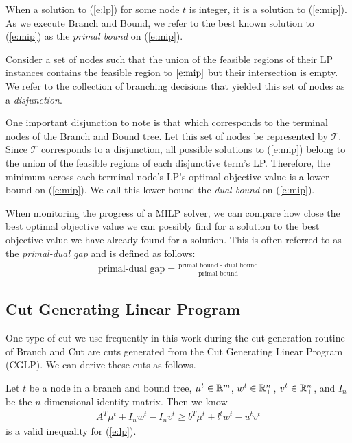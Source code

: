 \documentclass[10pt]{article}
\begin{document}
	When a solution to (\ref{e:lp}) for some node $ t $ is integer, it is a solution to (\ref{e:mip}). As we execute Branch and Bound, we refer to the best known solution to (\ref{e:mip}) as the \textit{primal bound} on (\ref{e:mip}).
	
	Consider a set of nodes such that the union of the feasible regions of their LP instances contains the feasible region to $ \ref{e:mip} $ but their intersection is empty. We refer to the collection of branching decisions that yielded this set of nodes as a \textit{disjunction}.
	
	One important disjunction to note is that which corresponds to the terminal nodes of the Branch and Bound tree. Let this set of nodes be represented by $ \mathcal{T} $. Since $ \mathcal{T} $ corresponds to a disjunction, all possible solutions to (\ref{e:mip}) belong to the union of the feasible regions of each disjunctive term's LP. Therefore, the minimum across each terminal node's LP's optimal objective value is a lower bound on (\ref{e:mip}). We call this lower bound the \textit{dual bound} on (\ref{e:mip}).
	
	When monitoring the progress of a MILP solver, we can compare how close the best optimal objective value we can possibly find for a solution to the best objective value we have already found for a solution. This is often referred to as the \textit{primal-dual gap} and is defined as follows:
	\begin{align}
		\text{primal-dual gap} = \frac{\text{primal bound - dual bound}}{\text{primal bound}} \label{e:mip_gap}
	\end{align}
	
	\subsection{Cut Generating Linear Program} \label{ss:cglp}
	One type of cut we use frequently in this work during the cut generation routine of Branch and Cut are cuts generated from the Cut Generating Linear Program (CGLP). We can derive these cuts as follows.
	
	Let $ t $ be a node in a branch and bound tree, $ \mu^t \in \mathbb{R}_+^m $, $ w^t \in \mathbb{R}_+^n $, $ v^t \in \mathbb{R}_+^n $, and $ I_n $ be the $ n $-dimensional identity matrix. Then we know
	\begin{align}
		A^T \mu^t + I_n w^t - I_n v^t \geq b^T \mu^t + l^t w^t - u^t v^t \label{e:valid_inequality}
	\end{align}
	is a valid inequality for (\ref{e:lp}).
	
\end{document}
